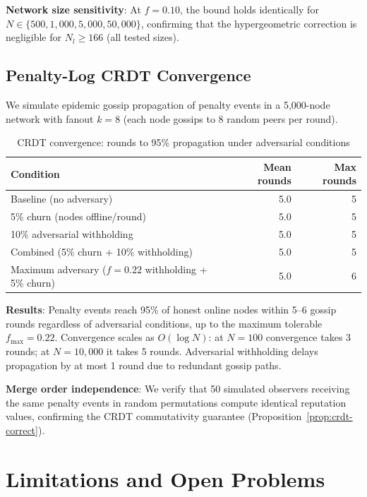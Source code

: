 \documentclass[11pt,a4paper]{article}
\begin{document}
\textbf{Network size sensitivity}: At $f = 0.10$, the bound holds identically for $N \in \{500, 1{,}000, 5{,}000, 50{,}000\}$, confirming that the hypergeometric correction is negligible for $N_l \geq 166$ (all tested sizes).

\subsection{Penalty-Log CRDT Convergence}

We simulate epidemic gossip propagation of penalty events in a 5,000-node network with fanout $k = 8$ (each node gossips to 8 random peers per round).

\begin{table}[h]
\centering
\caption{CRDT convergence: rounds to 95\% propagation under adversarial conditions}
\begin{tabular}{@{}lrr@{}}
\toprule
Condition & Mean rounds & Max rounds \\
\midrule
Baseline (no adversary) & 5.0 & 5 \\
5\% churn (nodes offline/round) & 5.0 & 5 \\
10\% adversarial withholding & 5.0 & 5 \\
Combined (5\% churn + 10\% withholding) & 5.0 & 5 \\
Maximum adversary ($f=0.22$ withholding + 5\% churn) & 5.0 & 6 \\
\bottomrule
\end{tabular}
\end{table}

\textbf{Results}: Penalty events reach 95\% of honest online nodes within 5--6 gossip rounds regardless of adversarial conditions, up to the maximum tolerable $f_{\max} = 0.22$. Convergence scales as $O(\log N)$: at $N=100$ convergence takes 3 rounds; at $N=10{,}000$ it takes 5 rounds. Adversarial withholding delays propagation by at most 1 round due to redundant gossip paths.

\textbf{Merge order independence}: We verify that 50 simulated observers receiving the same penalty events in random permutations compute identical reputation values, confirming the CRDT commutativity guarantee (Proposition~\ref{prop:crdt-correct}).


\section{Limitations and Open Problems}
\label{sec:limitations}
\end{document}
